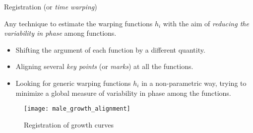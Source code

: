 \begin{definition}{Registration}{}
    (or \emph{time warping})

    Any technique to estimate the warping functions $h_i$ with the aim of \emph{reducing
    the variability in phase} among functions.

    \tcblower
    \begin{itemize}
        \item Shifting the argument of each function by a different quantity.
        \item Aligning several \emph{key points} (or \emph{marks}) at all the functions.
        \item Looking for generic warping functions $h_i$ in a non-parametric way, trying to
            minimize a global measure of variability in phase among the functions.
    \end{itemize}
\end{definition}

\begin{figure}[H]
    \texttt{[image: male\_growth\_alignment]}
    \caption{Registration of growth curves}
\end{figure}
